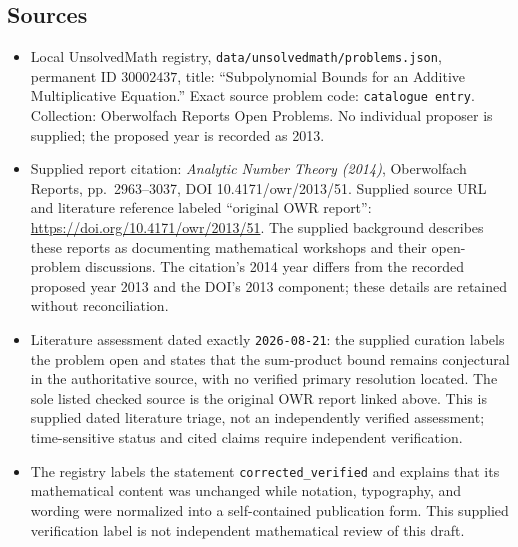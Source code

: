 \documentclass[11pt]{article}
\begin{document}
\subsection{Sources}
\begin{itemize}
\item Local UnsolvedMath registry, \texttt{data/unsolvedmath/problems.json}, permanent ID \(30002437\), title: ``Subpolynomial Bounds for an Additive Multiplicative Equation.'' Exact source problem code: \texttt{catalogue entry}. Collection: Oberwolfach Reports Open Problems. No individual proposer is supplied; the proposed year is recorded as 2013.
\item Supplied report citation: \emph{Analytic Number Theory (2014)}, Oberwolfach Reports, pp.\ 2963--3037, DOI 10.4171/owr/2013/51. Supplied source URL and literature reference labeled ``original OWR report'': \url{https://doi.org/10.4171/owr/2013/51}. The supplied background describes these reports as documenting mathematical workshops and their open-problem discussions. The citation's 2014 year differs from the recorded proposed year 2013 and the DOI's 2013 component; these details are retained without reconciliation.
\item Literature assessment dated exactly \texttt{2026-08-21}: the supplied curation labels the problem open and states that the sum-product bound remains conjectural in the authoritative source, with no verified primary resolution located. The sole listed checked source is the original OWR report linked above. This is supplied dated literature triage, not an independently verified assessment; time-sensitive status and cited claims require independent verification.
\item The registry labels the statement \texttt{corrected\_verified} and explains that its mathematical content was unchanged while notation, typography, and wording were normalized into a self-contained publication form. This supplied verification label is not independent mathematical review of this draft.
\end{itemize}
\end{document}
